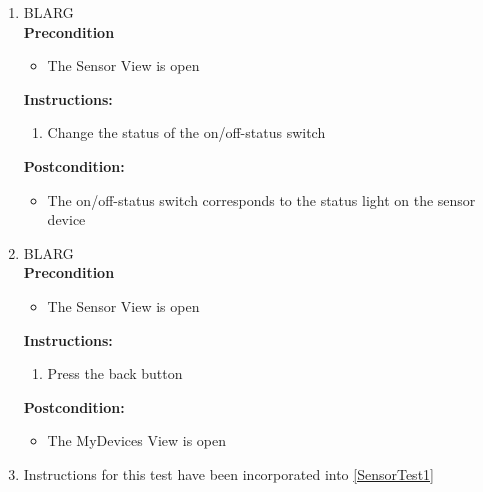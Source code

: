 \documentclass[a4paper]{article}
\newlength{\testlabellength}
\newenvironment{testlist}{\begin{enumerate}[label=\bfseries Instruction \thesubsection.\arabic* , labelindent=0pt, labelwidth=\testlabellength , leftmargin=2cm]}{\end{enumerate}}
\newenvironment{precondition}{
{\color{white}BLARG}\\ 
\textbf{Precondition}
\begin{itemize}[labelindent=0cm, labelwidth=2cm , leftmargin=1cm]
}
{\end{itemize}}
\newenvironment{instruction}{
\textbf{Instructions:}
\begin{enumerate}[label=\bfseries  \arabic*., labelindent=0cm, labelwidth=2cm , leftmargin=1cm]
}
{\end{enumerate}}
\newenvironment{postcondition}{
\textbf{Postcondition:}
\begin{itemize}[labelindent=0cm, labelwidth=2cm , leftmargin=1cm]
}
{\end{itemize}}
\begin{document}
\begin{appendices}
\begin{testlist}

	\item
		\begin{precondition}
			\item The Sensor View is open
		\end{precondition}
		\begin{instruction}
			\item Change the status of the on/off-status switch
		\end{instruction}
		\begin{postcondition}
			\item The on/off-status switch corresponds to the status light on the sensor device
		\end{postcondition}


	\item
		\begin{precondition}
			\item The Sensor View is open
		\end{precondition}
		\begin{instruction}
			\item Press the back button
		\end{instruction}
		\begin{postcondition}
			\item The MyDevices View is open
		\end{postcondition}



	\item
		Instructions for this test have been incorporated into \ref{SensorTest1}


\end{testlist}
\end{appendices}
\end{document}
